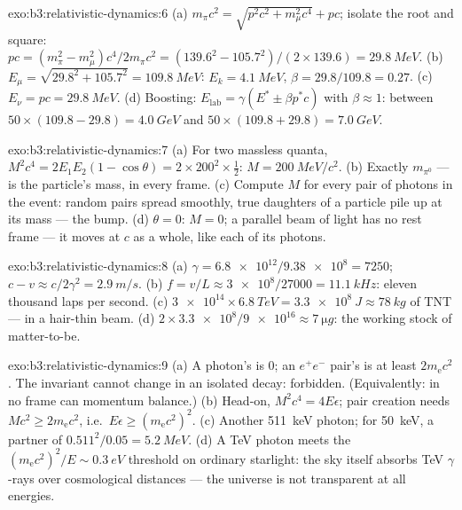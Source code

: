 \begin{solution}{exo:b3:relativistic-dynamics:6}
(a) $m_\pi c^2 = \sqrt{p^2c^2 + m_\mu^2c^4} + pc$; isolate the root
and square: $pc = (m_\pi^2 - m_\mu^2)c^4/2m_\pi c^2 =
(139.6^2 - 105.7^2)/(2 \times 139.6) = \qty{29.8}{MeV}$. (b) $E_\mu =
\sqrt{29.8^2 + 105.7^2} = \qty{109.8}{MeV}$: $E_k = \qty{4.1}{MeV}$,
$\beta = 29.8/109.8 = 0.27$. (c) $E_\nu = pc = \qty{29.8}{MeV}$. (d)
Boosting: $E_{\text{lab}} = \gamma(E^* \pm \beta p^*c)$ with $\beta
\approx 1$: between $50 \times (109.8 - 29.8) = \qty{4.0}{GeV}$ and
$50 \times (109.8 + 29.8) = \qty{7.0}{GeV}$.
\end{solution}

\begin{solution}{exo:b3:relativistic-dynamics:7}
(a) For two massless quanta, $M^2c^4 = 2E_1E_2(1 - \cos\theta) =
2 \times 200^2 \times \tfrac12$: $M = \qty{200}{MeV}/c^2$. (b)
Exactly $m_{\pi^0}$ ---  is the particle's mass, in
every frame. (c) Compute $M$ for every pair of photons in the event:
random pairs spread smoothly, true daughters of a particle pile up at
its mass --- the bump. (d) $\theta = 0$: $M = 0$; a parallel beam of
light has no rest frame --- it moves at $c$ as a whole, like each of
its photons.
\end{solution}

\begin{solution}{exo:b3:relativistic-dynamics:8}
(a) $\gamma = \num{6.8e12}/\num{9.38e8} = 7250$; $c - v \approx
c/2\gamma^2 = \qty{2.9}{m/s}$. (b) $f = v/L \approx \num{3e8}/27000 =
\qty{11.1}{kHz}$: eleven thousand laps per second. (c) $\num{3e14}
\times \qty{6.8}{TeV} = \qty{3.3e8}{J} \approx \qty{78}{kg}$ of TNT
--- in a hair-thin beam. (d) $2 \times \num{3.3e8}/\num{9e16} \approx
\qty{7}{\micro g}$: the working stock of matter-to-be.
\end{solution}

\begin{solution}{exo:b3:relativistic-dynamics:9}
(a) A photon's  is $0$; an $e^+e^-$ pair's is at least
$2m_{\text{e}}c^2$. The invariant cannot change in an isolated decay:
forbidden. (Equivalently: in no frame can momentum balance.) (b)
Head-on, $M^2c^4 = 4E\epsilon$; pair creation needs $Mc^2 \ge
2m_{\text{e}}c^2$, i.e.\ $E\epsilon \ge (m_{\text{e}}c^2)^2$. (c)
Another \qty{511}{keV} photon; for \qty{50}{keV}, a partner of
$0.511^2/0.05 = \qty{5.2}{MeV}$. (d) A TeV photon meets the
$(m_{\text{e}}c^2)^2/E \sim \qty{0.3}{eV}$ threshold on ordinary
starlight: the sky itself absorbs TeV $\gamma$-rays over cosmological
distances --- the universe is not transparent at all energies.
\end{solution}

